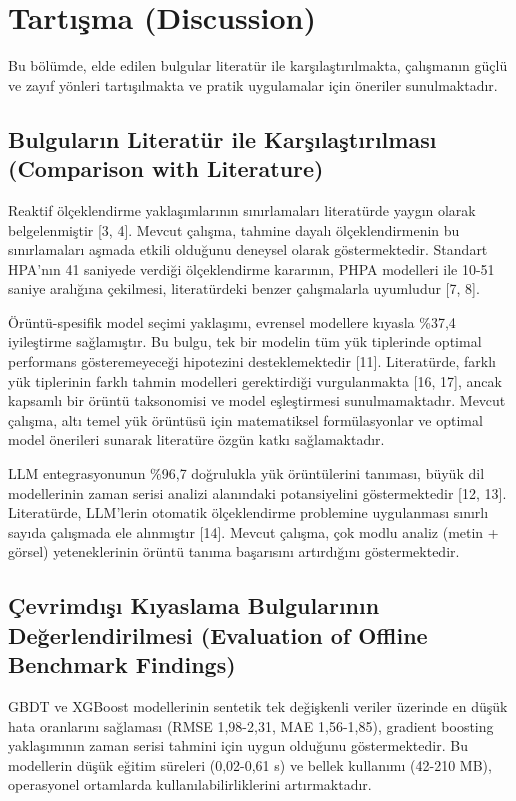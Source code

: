 
\section{Tartışma (Discussion)}

Bu bölümde, elde edilen bulgular literatür ile karşılaştırılmakta, çalışmanın güçlü ve zayıf yönleri tartışılmakta ve pratik uygulamalar için öneriler sunulmaktadır.

\subsection{Bulguların Literatür ile Karşılaştırılması (Comparison with Literature)}

Reaktif ölçeklendirme yaklaşımlarının sınırlamaları literatürde yaygın olarak belgelenmiştir [3, 4]. Mevcut çalışma, tahmine dayalı ölçeklendirmenin bu sınırlamaları aşmada etkili olduğunu deneysel olarak göstermektedir. Standart HPA'nın 41 saniyede verdiği ölçeklendirme kararının, PHPA modelleri ile 10-51 saniye aralığına çekilmesi, literatürdeki benzer çalışmalarla uyumludur [7, 8].

Örüntü-spesifik model seçimi yaklaşımı, evrensel modellere kıyasla \%37,4 iyileştirme sağlamıştır. Bu bulgu, tek bir modelin tüm yük tiplerinde optimal performans gösteremeyeceği hipotezini desteklemektedir [11]. Literatürde, farklı yük tiplerinin farklı tahmin modelleri gerektirdiği vurgulanmakta [16, 17], ancak kapsamlı bir örüntü taksonomisi ve model eşleştirmesi sunulmamaktadır. Mevcut çalışma, altı temel yük örüntüsü için matematiksel formülasyonlar ve optimal model önerileri sunarak literatüre özgün katkı sağlamaktadır.

LLM entegrasyonunun \%96,7 doğrulukla yük örüntülerini tanıması, büyük dil modellerinin zaman serisi analizi alanındaki potansiyelini göstermektedir [12, 13]. Literatürde, LLM'lerin otomatik ölçeklendirme problemine uygulanması sınırlı sayıda çalışmada ele alınmıştır [14]. Mevcut çalışma, çok modlu analiz (metin + görsel) yeteneklerinin örüntü tanıma başarısını artırdığını göstermektedir.

\subsection{Çevrimdışı Kıyaslama Bulgularının Değerlendirilmesi (Evaluation of Offline Benchmark Findings)}

GBDT ve XGBoost modellerinin sentetik tek değişkenli veriler üzerinde en düşük hata oranlarını sağlaması (RMSE 1,98-2,31, MAE 1,56-1,85), gradient boosting yaklaşımının zaman serisi tahmini için uygun olduğunu göstermektedir. Bu modellerin düşük eğitim süreleri (0,02-0,61 s) ve bellek kullanımı (42-210 MB), operasyonel ortamlarda kullanılabilirliklerini artırmaktadır.

